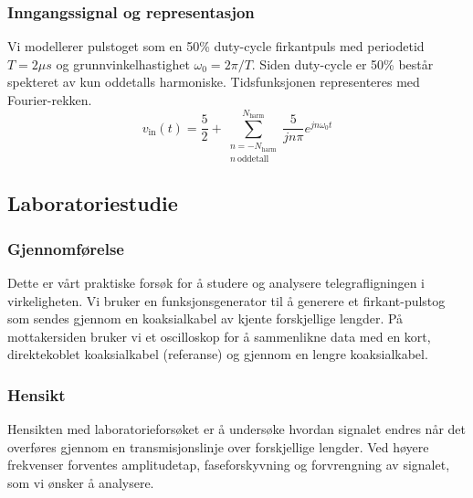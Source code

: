 \subsubsection{Inngangssignal og representasjon}
Vi modellerer pulstoget som en 50\% duty-cycle firkantpuls med periodetid $T = 2 \mu s$ og grunnvinkelhastighet $\omega_0 = 2\pi / T$. Siden duty-cycle er 50\% består spekteret av kun oddetalls harmoniske. Tidsfunksjonen representeres med Fourier-rekken.
\begin{equation}
    v_{\mathrm{in}}(t) = \frac{5}{2} + \sum_{\substack{n=-N_{\mathrm{harm}}\\ n\ \text{oddetall}}}^{N_{\mathrm{harm}}}\frac{5}{jn\pi} e^{jn\omega_0 t}
\end{equation} 
\clearpage

\subsection{Laboratoriestudie}
\subsubsection{Gjennomførelse} Dette er vårt praktiske forsøk for å studere og analysere telegrafligningen i virkeligheten. Vi bruker en funksjonsgenerator til å generere et firkant-pulstog som sendes gjennom en koaksialkabel av kjente forskjellige lengder. På mottakersiden bruker vi et oscilloskop for å sammenlikne data med en kort, direktekoblet koaksialkabel (referanse) og gjennom en lengre koaksialkabel.

\subsubsection{Hensikt} Hensikten med laboratorieforsøket er å undersøke hvordan signalet endres når det overføres gjennom en transmisjonslinje over forskjellige lengder. Ved høyere frekvenser forventes amplitudetap, faseforskyvning og forvrengning av signalet, som vi ønsker å analysere.
